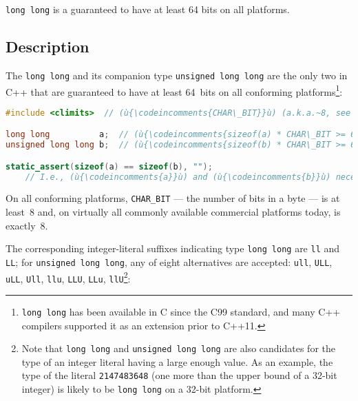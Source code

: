 

\lstinline!long!~\lstinline!long! is a  guaranteed to have at least 64 bits on all
platforms.

\subsection[Description]{Description}\label{description}

The  \lstinline!long!~\lstinline!long! and its companion
type \lstinline!unsigned!~\lstinline!long!~\lstinline!long! are the only two
 in C++ that are guaranteed to have
at least 64~bits on all conforming platforms{\cprotect\footnote{\lstinline!long!~\lstinline!long!
has been available in C since the C99 standard, and many C++ compilers
  supported it as an extension prior to C++11.}}:

\begin{lstlisting}[language=C++]
#include <climits>  // (ù{\codeincomments{CHAR\_BIT}}ù) (a.k.a.~8, see below)

long long          a;  // (ù{\codeincomments{sizeof(a) * CHAR\_BIT >= 64}}ù)
unsigned long long b;  // (ù{\codeincomments{sizeof(b) * CHAR\_BIT >= 64}}ù)

static_assert(sizeof(a) == sizeof(b), "");
    // I.e., (ù{\codeincomments{a}}ù) and (ù{\codeincomments{b}}ù) necessarily have the same size in every program.
\end{lstlisting}

\noindent On all conforming platforms, \lstinline!CHAR_BIT! --- the number of bits
in a byte --- is at least~8 and, on virtually all commonly available
commercial platforms today, is exactly~8.

The corresponding integer-literal suffixes indicating type
\lstinline!long!~\lstinline!long! are \lstinline!ll! and \lstinline!LL!; for
\lstinline!unsigned!~\lstinline!long!~\lstinline!long!, any of eight alternatives
are accepted: \lstinline!ull!, \lstinline!ULL!, \lstinline!uLL!, \lstinline!Ull!,
\lstinline!llu!, \lstinline!LLU!, \lstinline!LLu!,
\lstinline!llU!{\cprotect\footnote{Note that \lstinline!long!~\lstinline!long!
and \lstinline!unsigned!~\lstinline!long!~\lstinline!long! are also candidates
for the type of an integer literal having a large enough value. As an
example, the type of the literal \lstinline!2147483648! (one more than
the upper bound of a 32-bit integer) is likely to be
  \lstinline!long!~\lstinline!long! on a 32-bit platform.}}:

